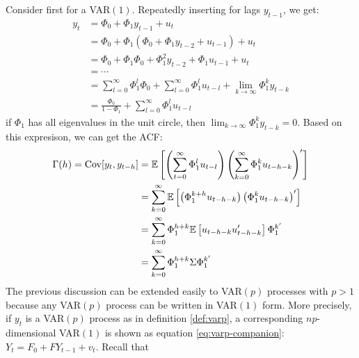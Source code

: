 Consider first for a VAR$(1)$. Repeatedly inserting for lags $y_{t-1}$, we get:
\begin{align*}
    y_t &= \Phi_0 + \Phi_1 y_{t-1} + u_t \\
    &= \Phi_0 + \Phi_1 (\Phi_0 + \Phi_1 y_{t-2} + u_{t-1}) + u_t \\
    &= \Phi_0 + \Phi_1 \Phi_0 + \Phi_1^2 y_{t-2} + \Phi_1 u_{t-1} + u_t \\
    &= \cdots \\
    &= \sum_{l=0}^{\infty} \Phi_1^l \Phi_0 + \sum_{l=0}^{\infty} \Phi_1^l u_{t-l} + \lim_{k \to \infty} \Phi_1^k y_{t-k} \\
    &= \frac{\Phi_0}{1 - \Phi_1} + \sum_{l=0}^{\infty} \Phi_1^l u_{t-l}
\end{align*}
if $\Phi_1$ has all eigenvalues in the unit circle, then $\lim_{k \to \infty} \Phi_1^k y_{t-k} = 0$.
Based on this expresison, we can get the ACF:
\begin{align*}
    \Gamma(h) = \operatorname{Cov}[y_t, y_{t-h}] &= \mathbb{E}\left[ \left(\sum_{t=0}^{\infty}\Phi_1^l u_{t-l} \right) \left( \sum_{k=0}^{\infty}\Phi_1^k u_{t-h-k} \right)^{\prime} \right] \\
    &= \sum_{k=0}^{\infty} \mathbb{E}\left[ \left(\Phi_1^{k+h} u_{t-h-k} \right) \left(\Phi_1^k u_{t-h-k} \right)^{\prime} \right] \\
    &= \sum_{k=0}^{\infty} \Phi_1^{h+k}  \mathbb{E}\left[ u_{t-h-k} u_{t-h-k}^{\prime} \right] \Phi_1^{k^{\prime}} \\
    &= \sum_{k=0}^{\infty} \Phi_1^{h+k} \Sigma \Phi_1^{k^{\prime}}
\end{align*}
The previous discussion can be extended easily to VAR$(p)$ processes with $p>1$ because any VAR$(p)$ process can be written in VAR$(1)$ form. 
More precisely, if $y_t$ is a VAR$(p)$ process as in definition \ref{def:varp},
a corresponding $np$-dimensional VAR$(1)$ is shown as equation \ref{eq:varp-companion}: $Y_t = F_0 + F Y_{t-1} + v_t$.
Recall that
